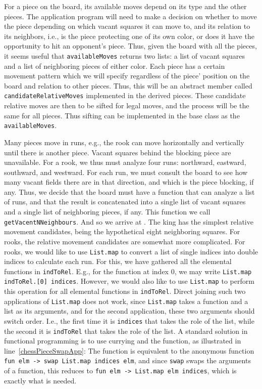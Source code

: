 For a piece on the board, its available moves depend on its type and the other pieces. The application program will need to make a decision on whether to move the piece depending on which vacant squares it can move to, and its relation to its neighbors, i.e., is the piece protecting one of its own color, or does it have the opportunity to hit an opponent's piece. Thus, given the board with all the pieces, it seems useful that \lstinline{availableMoves} returns two lists: a list of vacant squares and a list of neighboring pieces of either color. Each piece has a certain movement pattern which we will specify regardless of the piece' position on the board and relation to other pieces. Thus, this will be an abstract member called \lstinline{candidateRelativeMoves} implemented in the derived pieces. These candidate relative moves are then to be sifted for legal moves, and the process will be the same for all pieces. Thus sifting can be implemented in the base class as the \lstinline{availableMoves}.

Many pieces move in runs, e.g., the rook can move horizontally and vertically until there is another piece. Vacant squares behind the blocking piece are unavailable. For a rook, we thus must analyze four runs: northward, eastward, southward, and westward. For each run, we must consult the board to see how many vacant fields there are in that direction, and which is the piece blocking, if any. Thus, we decide that the board must have a function that can analyze a list of runs, and that the result is concatenated into a single list of vacant squares and a single list of neighboring pieces, if any. This function we call \lstinline{getVacentNNeighbours}. And so we arrive at .
%
%
The king has the simplest relative movement candidates, being the hypothetical eight neighboring squares. For rooks, the relative movement candidates are somewhat more complicated. For rooks, we would like to use \lstinline{List.map} to convert a list of single indices into double indices to calculate each run. For this, we have gathered all the elemental functions in \lstinline{indToRel}. E.g., for the function at index 0, we may write \lstinline{List.map indToRel.[0] indices}. However, we would also like to use \lstinline{List.map} to perform this operation for all elemental functions in \lstinline{indToRel}. Direct joining such two applications of \lstinline{List.map} does not work, since \lstinline{List.map} takes a function and a list as its arguments, and for the second application, these two arguments should switch order.  I.e., the first time it is \lstinline{indices} that takes the role of the list, while the second it is \lstinline{indToRel} that takes the role of the list. A standard solution in functional programming is to use currying and the  function, as illustrated in line~\ref{chessPieceSwapApp}: The function is equivalent to the anonymous function \lstinline{fun elm -> swap List.map indices elm}, and since \lstinline{swap} swaps the arguments of a function, this reduces to \lstinline{fun elm -> List.map elm indices}, which is exactly what is needed.

